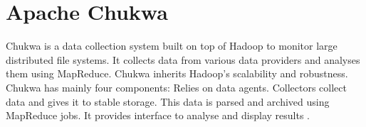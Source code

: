 \section{Apache Chukwa}

Chukwa \cite{hid-sp-421-ChukwaCloud} is a data collection system built on top of
Hadoop to monitor large distributed file systems. It collects data from various
data providers and analyses them using MapReduce. Chukwa inherits Hadoop’s
scalability and robustness. Chukwa has mainly four components: Relies on data
agents. Collectors collect data and gives it to stable storage. This data is
parsed and archived using MapReduce jobs. It provides interface to analyse and
display results \cite{ChukwaComponents}.


